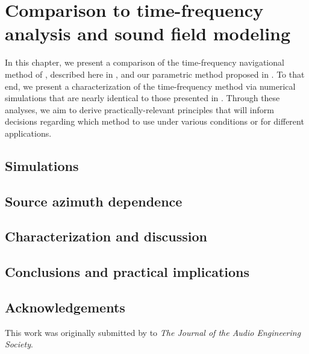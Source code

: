 \chapter{Comparison to time-frequency analysis and sound field modeling}\label{chap:09_Thiergart_Comparison}
In this chapter, we present a comparison of the time-frequency navigational method of \citet{Thiergart2013}, described here in 
, and our parametric method proposed in .
To that end, we present a characterization of the time-frequency method via numerical simulations that are nearly identical to those presented in .
Through these analyses, we aim to derive practically-relevant principles that will inform decisions regarding which method to use under various conditions or for different applications.


\section{Simulations}\label{sec:09_Thiergart_Comparison:Simulations}


\section{Source azimuth dependence}\label{sec:09_Thiergart_Comparison:Azimuth_Dependence}


\section{Characterization and discussion}\label{sec:09_Thiergart_Comparison:Results}


\section{Conclusions and practical implications}\label{sec:09_Thiergart_Comparison:Conclusions}


\section*{Acknowledgements}
This work was originally submitted by \citet{TylkaChoueiri2019d} to \textit{The Journal of the Audio Engineering Society}.